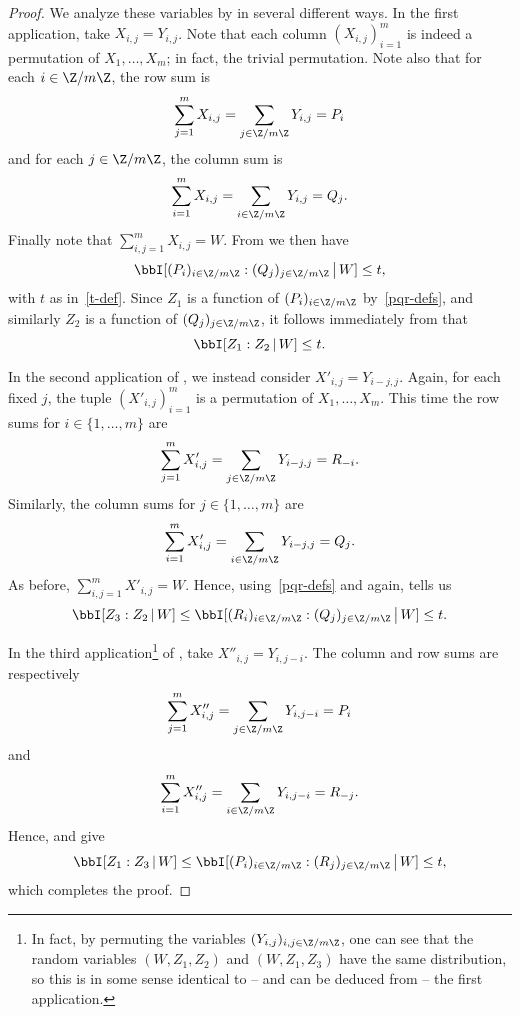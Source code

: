 \begin{proof}\leanok
  We analyze these variables by  in several different ways.
  In the first application, take $X_{i,j}=Y_{i,j}$.
  Note that each column $(X_{i,j})_{i=1}^m$ is indeed a permutation of $X_1,\dots,X_m$; in fact, the trivial permutation.
  Note also that for each $i \in \Z/m\Z$, the row sum is
  \[
    \sum_{j=1}^m X_{i,j} = \sum_{j \in \Z/m\Z} Y_{i,j} = P_i
  \]
  and for each $j \in \Z/m\Z$, the column sum is
  \[
    \sum_{i=1}^m X_{i,j} = \sum_{i \in \Z/m\Z} Y_{i,j} = Q_j.
  \]
  Finally note that $\sum_{i,j=1}^m X_{i,j} = W$.
  From  we then have
  \[
    \bbI[ (P_i)_{i \in \Z/m\Z} : (Q_j)_{j \in \Z/m\Z } \,\big|\, W ] \leq t,
  \]
  with $t$ as in~\eqref{t-def}.
  Since $Z_1$ is a function of $(P_i)_{i \in \Z/m\Z}$ by~\eqref{pqr-defs}, and similarly $Z_2$ is a function of $(Q_j)_{j \in \Z/m\Z}$, it follows immediately from  that
  \[
    \bbI[ Z_1 : Z_2 \,|\, W ] \leq t.
  \]

  In the second application of , we instead consider $X'_{i,j} = Y_{i-j,j}$.
  Again, for each fixed $j$, the tuple $(X'_{i,j})_{i=1}^m$ is a permutation of $X_1,\dots,X_m$.
  This time the row sums for $i \in \{1,\dots, m\}$ are
  \[
    \sum_{j=1}^m X'_{i,j} = \sum_{j \in \Z/m\Z} Y_{i-j,j} = R_{-i}.
  \]
 Similarly, the column sums for $j \in \{1,\dots, m\}$ are
  \[
    \sum_{i=1}^m X'_{i,j} = \sum_{i \in \Z/m\Z} Y_{i-j,j} = Q_j.
  \]
  As before, $\sum_{i,j=1}^m X'_{i,j} = W$.
  Hence, using~\eqref{pqr-defs} and  again,  tells us
  \[
    \bbI[ Z_3 :  Z_2 \,|\, W] \leq \bbI[ (R_i)_{i \in \Z/m\Z} : (Q_j)_{j \in \Z/m\Z } \,\big|\, W ] \leq t.
  \]

  In the third application\footnote{In fact, by permuting the variables $(Y_{i,j})_{i,j \in \Z/m\Z}$, one can see that the random variables $(W, Z_1, Z_2)$ and $(W, Z_1, Z_3)$ have the same distribution, so this is in some sense identical to -- and can be deduced from -- the first application.} of , take $X''_{i,j} = Y_{i,j-i}$.
  The column and row sums are respectively
  \[
    \sum_{j=1}^m X''_{i,j} = \sum_{j \in \Z/m\Z} Y_{i,j-i} = P_i \] and
\[     \sum_{i=1}^m X''_{i,j} = \sum_{i \in \Z/m\Z} Y_{i,j-i} = R_{-j}.
  \]
  Hence,  and  give
  \[
    \bbI[ Z_1 : Z_3 \,|\, W] \leq \bbI[ (P_i)_{i \in \Z/m\Z} : (R_j)_{j \in \Z/m\Z } \,\big|\, W ] \leq t,
  \]
  which completes the proof.
\end{proof}

